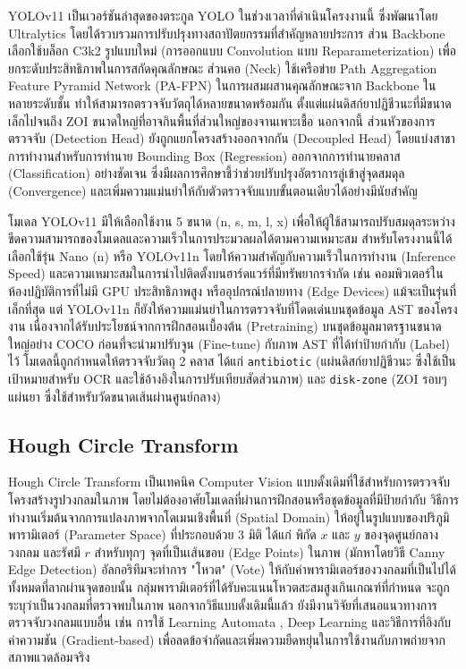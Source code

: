 YOLOv11 เป็นเวอร์ชันล่าสุดของตระกูล YOLO ในช่วงเวลาที่ดำเนินโครงงานนี้ ซึ่งพัฒนาโดย Ultralytics โดยได้รวบรวมการปรับปรุงทางสถาปัตยกรรมที่สำคัญหลายประการ \cite{wang2024yolov11} ส่วน Backbone เลือกใช้บล็อก C3k2 รูปแบบใหม่ (การออกแบบ Convolution แบบ Reparameterization) เพื่อยกระดับประสิทธิภาพในการสกัดคุณลักษณะ ส่วนคอ (Neck) ใช้เครือข่าย Path Aggregation Feature Pyramid Network (PA-FPN) ในการผสมผสานคุณลักษณะจาก Backbone ในหลายระดับชั้น ทำให้สามารถตรวจจับวัตถุได้หลายขนาดพร้อมกัน ตั้งแต่แผ่นดิสก์ยาปฏิชีวนะที่มีขนาดเล็กไปจนถึง ZOI ขนาดใหญ่ที่อาจกินพื้นที่ส่วนใหญ่ของจานเพาะเชื้อ นอกจากนี้ ส่วนหัวของการตรวจจับ (Detection Head) ยังถูกแยกโครงสร้างออกจากกัน (Decoupled Head) โดยแบ่งสาขาการทำงานสำหรับการทำนาย Bounding Box (Regression) ออกจากการทำนายคลาส (Classification) อย่างชัดเจน ซึ่งมีผลการศึกษาชี้ว่าช่วยปรับปรุงอัตราการลู่เข้าสู่จุดสมดุล (Convergence) และเพิ่มความแม่นยำให้กับตัวตรวจจับแบบขั้นตอนเดียวได้อย่างมีนัยสำคัญ

โมเดล YOLOv11 มีให้เลือกใช้งาน 5 ขนาด (n, s, m, l, x) เพื่อให้ผู้ใช้สามารถปรับสมดุลระหว่างขีดความสามารถของโมเดลและความเร็วในการประมวลผลได้ตามความเหมาะสม สำหรับโครงงานนี้ได้เลือกใช้รุ่น Nano (n) หรือ YOLOv11n โดยให้ความสำคัญกับความเร็วในการทำงาน (Inference Speed) และความเหมาะสมในการนำไปติดตั้งบนฮาร์ดแวร์ที่มีทรัพยากรจำกัด เช่น คอมพิวเตอร์ในห้องปฏิบัติการที่ไม่มี GPU ประสิทธิภาพสูง หรืออุปกรณ์ปลายทาง (Edge Devices) แม้จะเป็นรุ่นที่เล็กที่สุด แต่ YOLOv11n ก็ยังให้ความแม่นยำในการตรวจจับที่โดดเด่นบนชุดข้อมูล AST ของโครงงาน เนื่องจากได้รับประโยชน์จากการฝึกสอนเบื้องต้น (Pretraining) บนชุดข้อมูลมาตรฐานขนาดใหญ่อย่าง COCO ก่อนที่จะนำมาปรับจูน (Fine-tune) กับภาพ AST ที่ได้ทำป้ายกำกับ (Label) ไว้ โมเดลนี้ถูกกำหนดให้ตรวจจับวัตถุ 2 คลาส ได้แก่ \texttt{antibiotic} (แผ่นดิสก์ยาปฏิชีวนะ ซึ่งใช้เป็นเป้าหมายสำหรับ OCR และใช้อ้างอิงในการปรับเทียบสัดส่วนภาพ) และ \texttt{disk-zone} (ZOI รอบๆ แผ่นยา ซึ่งใช้สำหรับวัดขนาดเส้นผ่านศูนย์กลาง)

\subsection{Hough Circle Transform}

Hough Circle Transform เป็นเทคนิค Computer Vision แบบดั้งเดิมที่ใช้สำหรับการตรวจจับโครงสร้างรูปวงกลมในภาพ โดยไม่ต้องอาศัยโมเดลที่ผ่านการฝึกสอนหรือชุดข้อมูลที่มีป้ายกำกับ วิธีการทำงานเริ่มต้นจากการแปลงภาพจากโดเมนเชิงพื้นที่ (Spatial Domain) ให้อยู่ในรูปแบบของปริภูมิพารามิเตอร์ (Parameter Space) ที่ประกอบด้วย 3 มิติ ได้แก่ พิกัด $x$ และ $y$ ของจุดศูนย์กลางวงกลม และรัศมี $r$ สำหรับทุกๆ จุดที่เป็นเส้นขอบ (Edge Points) ในภาพ (มักหาโดยวิธี Canny Edge Detection) อัลกอริทึมจะทำการ "โหวต" (Vote) ให้กับค่าพารามิเตอร์ของวงกลมที่เป็นไปได้ทั้งหมดที่ลากผ่านจุดขอบนั้น กลุ่มพารามิเตอร์ที่ได้รับคะแนนโหวตสะสมสูงเกินเกณฑ์ที่กำหนด จะถูกระบุว่าเป็นวงกลมที่ตรวจพบในภาพ นอกจากวิธีแบบดั้งเดิมนี้แล้ว ยังมีงานวิจัยที่เสนอแนวทางการตรวจจับวงกลมแบบอื่น เช่น การใช้ Learning Automata \cite{cuevas2014}, Deep Learning \cite{ercan2020} และวิธีการที่อิงกับค่าความชัน (Gradient-based) \cite{shehata2015hough} เพื่อลดข้อจำกัดและเพิ่มความยืดหยุ่นในการใช้งานกับภาพถ่ายจากสภาพแวดล้อมจริง


